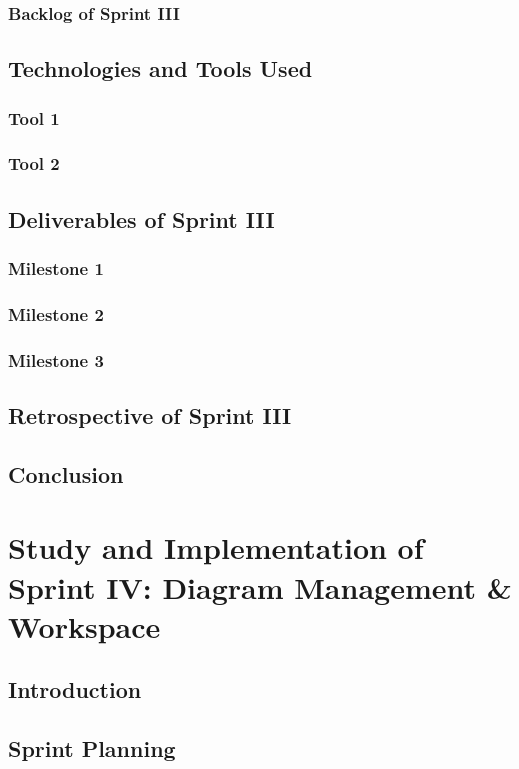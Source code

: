 \documentclass[a4paper,12pt]{report}
\begin{document}
\subsection{Backlog of Sprint III}
\section{Technologies and Tools Used}
\subsection{Tool 1}
\subsection{Tool 2}
\section{Deliverables of Sprint III}
\subsection{Milestone 1}
\subsection{Milestone 2}
\subsection{Milestone 3}
\section{Retrospective of Sprint III}
\section{Conclusion}

\chapter[Sprint IV]{Study and Implementation of Sprint IV: Diagram Management \& Workspace}

\minitoc
\section{Introduction}
\section{Sprint Planning}
\end{document}

